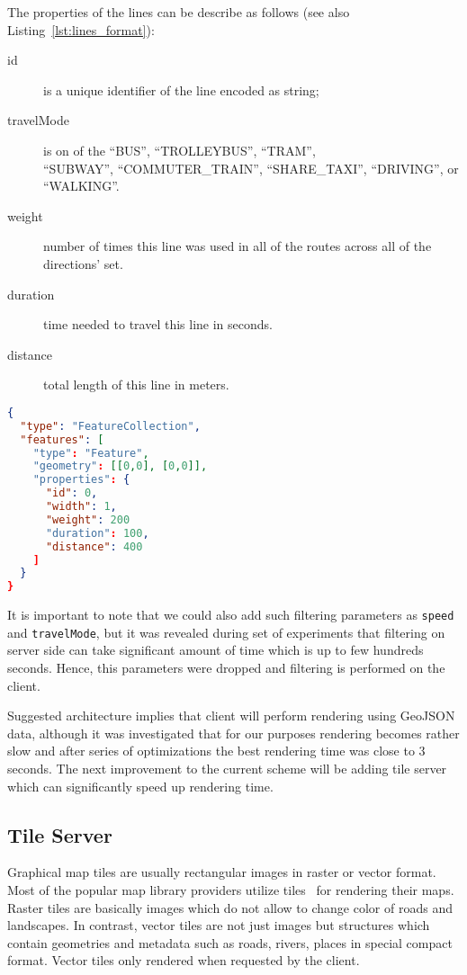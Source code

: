 \begin{itemize}
  The properties of the lines can be describe as follows (see also Listing~\ref{lst:lines_format}):
  \begin{description}
    \item[id] is a unique identifier of the line encoded as string;
    \item[travelMode] is on of the \mbox{``BUS''}, \mbox{``TROLLEYBUS''},
    \mbox{``TRAM''}, \\ \mbox{``SUBWAY''}, \mbox{``COMMUTER\_TRAIN''}, \mbox{``SHARE\_TAXI''},
    \mbox{``DRIVING''}, or \\ \mbox{``WALKING''}.
    \item[weight] number of times this line was used in all of the routes across all of
    the directions' set.
    \item[duration] time needed to travel this line in seconds.
    \item[distance] total length of this line in meters.
  \end{description}

\begin{lstlisting}[language=json, caption=Lines response example, label={lst:lines_format}]
{
  "type": "FeatureCollection",
  "features": [
    "type": "Feature",
    "geometry": [[0,0], [0,0]],
    "properties": {
      "id": 0,
      "width": 1,
      "weight": 200
      "duration": 100,
      "distance": 400
    ]
  }
}
\end{lstlisting}
\end{itemize}

It is important to note that we could also add such filtering parameters as \texttt{speed} and
\texttt{travelMode}, but it was revealed during set of experiments that
filtering on server side can take significant amount of time which is up to few
hundreds seconds. Hence, this parameters were dropped and filtering is performed on the client.

Suggested architecture implies that client will perform rendering using GeoJSON data, although
it was investigated that for our purposes rendering becomes rather slow and after series of
optimizations the best rendering time was close to 3 seconds. The next improvement to the
current scheme will be adding tile server which can significantly speed up rendering time.

\subsection{Tile Server}
Graphical map tiles are usually rectangular images in raster or vector format. Most of the popular
map library providers utilize tiles~\cite{google:tiles, mapbox:tiles} for rendering their maps.
Raster tiles are basically images which do not allow to change color of roads and landscapes.
In contrast, vector tiles are not just images but structures which contain geometries and
metadata such as roads, rivers, places in special compact format. Vector tiles only rendered when
requested by the client.

